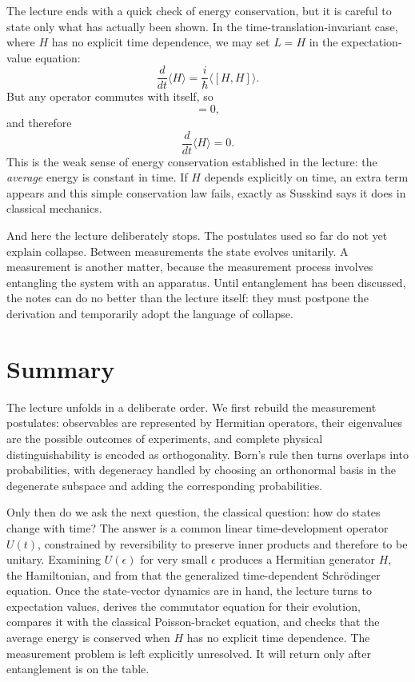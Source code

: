 The lecture ends with a quick check of energy conservation, but it is careful to state only what has actually been shown. In the time-translation-invariant case, where \(H\) has no explicit time dependence, we may set \(L=H\) in the expectation-value equation:
\begin{equation}
\frac{d}{dt}\langle H\rangle=\frac{i}{\hbar}\langle [H,H]\rangle.
\end{equation}
But any operator commutes with itself, so
\begin{equation}
[H,H]=0,
\end{equation}
and therefore
\begin{equation}
\frac{d}{dt}\langle H\rangle=0.
\end{equation}
This is the weak sense of energy conservation established in the lecture: the \emph{average} energy is constant in time. If \(H\) depends explicitly on time, an extra term appears and this simple conservation law fails, exactly as Susskind says it does in classical mechanics.

And here the lecture deliberately stops. The postulates used so far do not yet explain collapse. Between measurements the state evolves unitarily. A measurement is another matter, because the measurement process involves entangling the system with an apparatus. Until entanglement has been discussed, the notes can do no better than the lecture itself: they must postpone the derivation and temporarily adopt the language of collapse.

\section{Summary}

The lecture unfolds in a deliberate order. We first rebuild the measurement postulates: observables are represented by Hermitian operators, their eigenvalues are the possible outcomes of experiments, and complete physical distinguishability is encoded as orthogonality. Born's rule then turns overlaps into probabilities, with degeneracy handled by choosing an orthonormal basis in the degenerate subspace and adding the corresponding probabilities.

Only then do we ask the next question, the classical question: how do states change with time? The answer is a common linear time-development operator \(U(t)\), constrained by reversibility to preserve inner products and therefore to be unitary. Examining \(U(\epsilon)\) for very small \(\epsilon\) produces a Hermitian generator \(H\), the Hamiltonian, and from that the generalized time-dependent Schr\"odinger equation. Once the state-vector dynamics are in hand, the lecture turns to expectation values, derives the commutator equation for their evolution, compares it with the classical Poisson-bracket equation, and checks that the average energy is conserved when \(H\) has no explicit time dependence. The measurement problem is left explicitly unresolved. It will return only after entanglement is on the table.